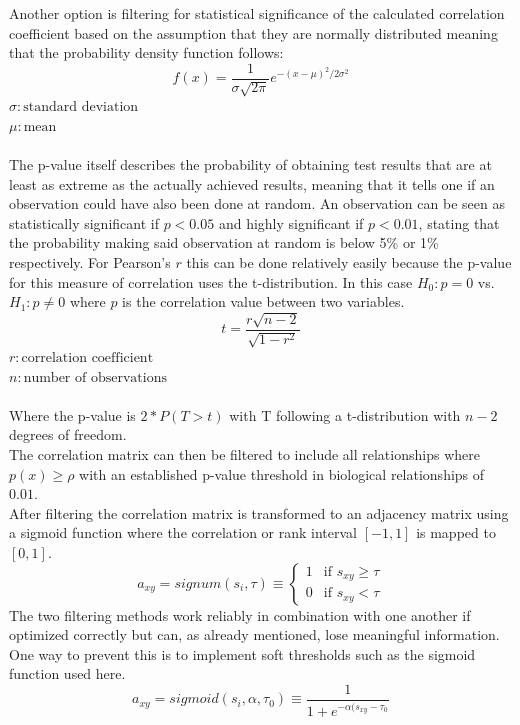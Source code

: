 Another option is filtering for statistical significance of the calculated correlation coefficient based on the assumption that they are normally distributed meaning that the probability density function follows:\\
\begin{equation}
    f(x)=\frac{1}{\sigma \sqrt{2\pi}}e^{-(x-\mu)^2/2\sigma^2}
\end{equation}
$\sigma:\text{standard deviation}$\\
$\mu:\text{mean}$\\
\\
The p-value itself describes the probability of obtaining test results that are at least as extreme as the actually achieved results, meaning that it tells one if an observation could have also been done at random. An observation can be seen as statistically significant if $p < 0.05$ and highly significant if $p < 0.01$, stating that the probability making said observation at random is below 5\% or 1\% respectively.
For Pearson's $r$ this can be done relatively easily because the p-value for this measure of correlation uses the t-distribution. In this case $H_0:p=0$ vs. $H_1: p\ne0$ where $p$ is the correlation value between two variables.\\
\begin{equation}
    t = \frac{r\sqrt{n-2}}{\sqrt{1-r^2}}
\end{equation}
$r:\text{correlation coefficient}$\\
$n:\text{number of observations}$\\
\\
Where the p-value is $2*P(T>t)$ with T following a t-distribution with $n-2$ degrees of freedom.\\
The correlation matrix can then be filtered to include all relationships where $p(x) \geq \rho$ with an established p-value threshold in biological relationships of $0.01$.\\
After filtering the correlation matrix is transformed to an adjacency matrix using a sigmoid function where the correlation or rank interval $[-1,1]$ is mapped to $[0,1]$.\\
\begin{equation}
    a_{xy}=signum(s_i, \tau) \equiv 
    \begin{cases}
        1 & \text{if $s_{xy} \geq \tau$}\\
        0 & \text{if  $s_{xy} < \tau$}
    \end{cases}
\end{equation}
The two filtering methods work reliably in combination with one another if optimized correctly but can, as already mentioned, lose meaningful information. One way to prevent this is to implement soft thresholds such as the sigmoid function used here.\\
\begin{equation}
    a_{xy}=sigmoid(s_i,\alpha,\tau_0)\equiv\frac{1}{1+e^{-\alpha(s_{xy}-\tau_0}}
\end{equation}

